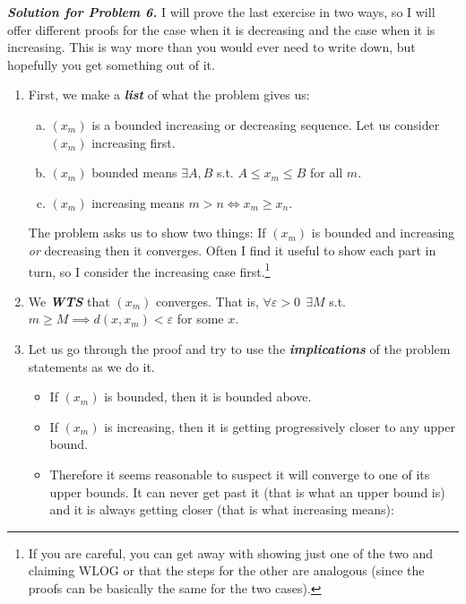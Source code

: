 \documentclass{article}
\begin{document}
\textbf{\textit{Solution for Problem 6.}} I will prove the last exercise in two ways, so I will offer different proofs for the case when it is decreasing and the case when it is increasing. This is way more than you would  ever need to write down, but hopefully you get something out of it.
\begin{enumerate}
  \item First, we make a \textbf{\textit{list}} of what the problem gives us:
    \begin{enumerate}[a)]
      \item $(x_m)$ is a bounded increasing or decreasing sequence.  Let us consider $(x_m)$ increasing first.
        \label{item:ps1_pp6_bound_mono}

      \item $(x_m)$ bounded means $\exists A, B$ s.t. $A \le x_m \le B$ for all $m$.
        \label{item:ps1_pp6_bound}

      \item $(x_m)$ increasing means $m > n \iff x_m \ge x_n$.
        \label{item:ps1_pp6_increasing}
    \end{enumerate}

    The problem asks us to show two things: If $(x_m)$ is bounded and increasing \textit{or} decreasing then it converges. Often I find it useful to show each part in turn, so I consider the increasing case first.\footnote{If you are careful, you can get away with showing just one of the two and claiming WLOG or that the steps for the other are analogous (since the proofs can be basically the same for the two cases).}
      \label{item:ps1_pp6_list}

  \item We \textit{\textbf{WTS}} that $(x_m)$ converges. That is, $\forall \varepsilon > 0 ~~ \exists M$ s.t. $m \ge M \implies d(x, x_m) < \varepsilon$ for some $x$.

  \item Let us go through the proof and try to use the \textit{\textbf{implications}} of the problem statements as we do it.
    \begin{itemize}[label=$\circ$]
      \item If $(x_m)$ is bounded, then it is bounded above.

      \item If $(x_m)$ is increasing, then it is getting progressively closer to any upper bound.

      \item Therefore it seems reasonable to suspect it will converge to one of its upper bounds. It can never get past it (that is what an upper bound is) and it is always getting closer (that is what increasing means):
        \begin{figure}[H]
          \centering
\end{figure}
\end{itemize}
\end{enumerate}
\end{document}
